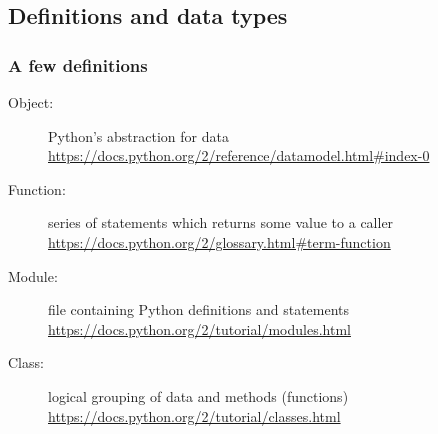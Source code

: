 \subsection{Definitions and data types}
\begin{frame}[fragile]
\frametitle{A few definitions}

\begin{description}
\item[Object:] Python's abstraction for data\\
\url{https://docs.python.org/2/reference/datamodel.html#index-0}
\item[Function:] series of statements which returns some value to a caller\\
\url{https://docs.python.org/2/glossary.html#term-function}
\item[Module:] file containing Python definitions and statements\\
\url{https://docs.python.org/2/tutorial/modules.html}
\item[Class:] logical grouping of data and methods (functions)\\
\url{https://docs.python.org/2/tutorial/classes.html}
\end{description}

\end{frame}


